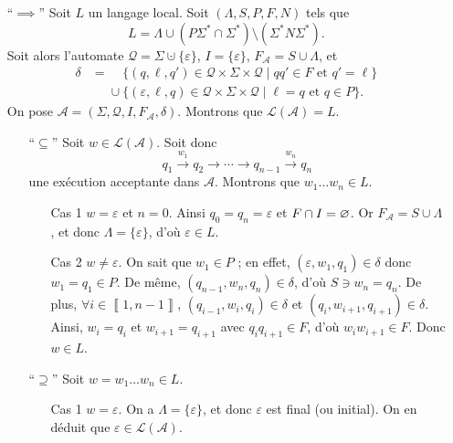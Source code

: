\begin{prv}
	\begin{itemize}
		\item[``$\implies$''] Soit $L$\/ un langage local. Soit $(\Lambda,S,P,F,N)$\/ tels que \[
				L = \Lambda \cup (P\Sigma^*\cap \Sigma^*) \setminus (\Sigma^* N\Sigma^*)
			.\]
			Soit alors l'automate $\mathcal{Q} = \Sigma \cupdot \{\varepsilon\}$, $I = \{\varepsilon\}$, $F_\mathcal{A} = S \cup \Lambda$, et
			\begin{align*}
				\delta &= \phantom{\cup}\{(q,\ell,q') \in \mathcal{Q} \times \Sigma \times \mathcal{Q}  \mid qq' \in F \text{ et } q' = \ell\}\\
				&\mathrel{\phantom{=}} \cup \{(\varepsilon,\ell,q) \in \mathcal{Q}\times \Sigma \times \mathcal{Q}  \mid  \ell = q \text{ et } q \in P\}.
			\end{align*}
			On pose $\mathcal{A} = (\Sigma, \mathcal{Q}, I, F_\mathcal{A}, \delta)$. Montrons que $\mathcal{L}(\mathcal{A}) = L$.
			\begin{itemize}
				\item[``$\subseteq$''] Soit $w \in \mathcal{L}(\mathcal{A})$. Soit donc \[q_1 \xrightarrow{w_1} q_2 \to \cdots \to q_{n-1} \xrightarrow{w_n} q_n\] une exécution acceptante dans $\mathcal{A}$. Montrons que $w_1\ldots w_n \in L$.
					\begin{itemize}
						\item[Cas 1] $w = \varepsilon$\/ et $n = 0$. Ainsi $q_0 = q_n = \varepsilon$\/ et $F \cap I = \varnothing$. Or $F_\mathcal{A} = S \cup \Lambda$, et donc $\Lambda = \{\varepsilon\}$, d'où $\varepsilon \in L$.
						\item[Cas 2] $w \neq \varepsilon$. On sait que $w_1 \in P$\/ ; en effet, $(\varepsilon, w_1, q_1) \in \delta$\/ donc $w_1 = q_1 \in P$.
							De même, $(q_{n-1}, w_n,q_n) \in \delta$, d'où $S \ni w_n = q_n$.
							De plus, $\forall i \in \left\llbracket 1,n-1 \right\rrbracket$, $(q_{i-1}, w_i, q_i) \in \delta$\/ et $(q_i, w_{i+1}, q_{i+1}) \in \delta$.
							Ainsi, $w_i = q_i$\/ et $w_{i+1} = q_{i+1}$\/ avec $q_iq_{i+1} \in F$, d'où $w_iw_{i+1} \in F$. Donc $w \in L$.
					\end{itemize}
				\item[``$\supseteq$''] Soit $w = w_1\ldots w_n \in L$.
					\begin{itemize}
						\item[Cas 1] $w = \varepsilon$. On a $\Lambda = \{\varepsilon\}$, et donc $\varepsilon$\/ est final (ou initial). On en déduit que $\varepsilon \in \mathcal{L}(\mathcal{A})$.

\end{itemize}
\end{itemize}
\end{itemize}
\end{prv}
